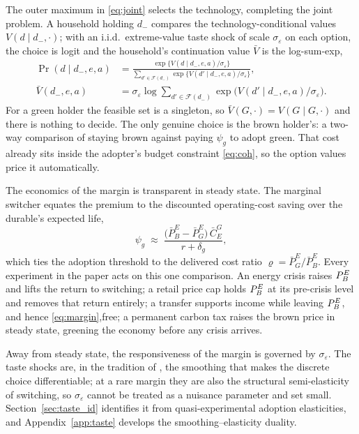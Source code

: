 The outer maximum in \eqref{eq:joint} selects the technology, completing the joint
problem. A household holding $d_-$ compares the technology-conditional values
$V(d\mid d_-,\cdot)$; with an i.i.d.\ extreme-value taste shock of scale
$\sigma_\varepsilon$ on each option, the choice is logit and the household's
continuation value $\bar V$ is the log-sum-exp,
%
\begin{equation}
\begin{aligned}
\Pr(d\mid d_-,e, a)&=
\frac{\exp\{V(d\mid d_-,e, a)/\sigma_\varepsilon\}}
{\sum_{d'\in\mathcal F(d_-)}\exp\{V(d'\mid d_-,e, a)/\sigma_\varepsilon\}},\\[4pt]
\bar V(d_-,e, a)&=\sigma_\varepsilon\log\!\!\sum_{d'\in\mathcal F(d_-)}\!\!
\exp\bigl(V(d'\mid d_-,e, a)/\sigma_\varepsilon\bigr).
\end{aligned}
\label{eq:logit}
\end{equation}
%
For a green holder the feasible set is a singleton, so $\bar V(G,\cdot)=V(G\mid G,\cdot)$
and there is nothing to decide. The only genuine choice is the brown holder's: a
two-way comparison of staying brown against paying $\psi_g$ to adopt green. That cost
already sits inside the adopter's budget constraint \eqref{eq:coh}, so the option values
price it automatically.

The economics of the margin is transparent in steady state. The marginal switcher
equates the premium to the discounted operating-cost saving over the durable's
expected life,
%
\begin{equation}
\psi_g\;\approx\;\frac{\bigl(\bar P^E_B-\bar P^E_G\bigr)\,\bar C^G_E}{r+\delta_g},
\label{eq:margin}
\end{equation}
%
which ties the adoption threshold to the delivered cost ratio
$\varrho=\bar P^E_G/\bar P^E_B$. Every experiment in the paper acts on this one
comparison. An energy crisis raises $P^{E}_{B}$ and lifts the return to switching; a
retail price cap holds $P^{E}_{B}$ at its pre-crisis level and removes that return
entirely; a transfer supports income while leaving $P^{E}_{B}$, and hence
\eqref{eq:margin},free; a permanent carbon tax raises the brown price in steady
state, greening the economy before any crisis arrives.

Away from steady state, the responsiveness of the margin is governed by
$\sigma_\varepsilon$. The taste shocks are, in the tradition of \citet{DCEGM2017},
the smoothing that makes the discrete choice differentiable; at a rare margin they are
also the structural semi-elasticity of switching, so $\sigma_\varepsilon$ cannot be
treated as a nuisance parameter and set small. Section~\ref{sec:taste_id} identifies
it from quasi-experimental adoption elasticities, and Appendix~\ref{app:taste}
develops the smoothing--elasticity duality.

